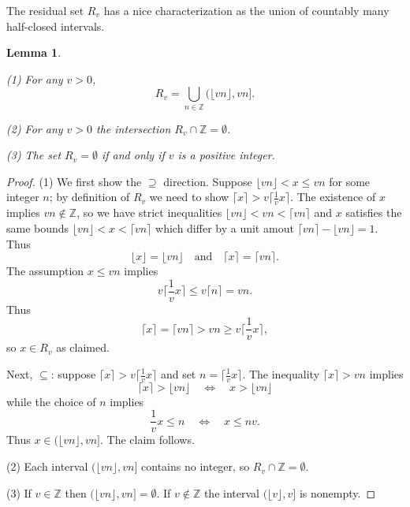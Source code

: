 \documentclass[12pt,letterpaper, reqno]{amsart}
\newtheorem{lem}[thm]{Lemma}
\theoremstyle{definition}
\theoremstyle{remark}
\newcommand{\ZZ}{\ensuremath{\mathbb{Z}}}
\newcommand{\R}{{R}}
\newcommand{\floor}[1]{\lfloor{#1}\rfloor}
\newcommand{\ceil}[1]{\lceil{#1}\rceil}
\begin{document}
The residual set $R_v$ has a nice characterization as the union of countably many half-closed intervals.
\begin{lem}\label{lem:41}

(1) For any $v>0$,
\[ \R_v = \bigcup_{n\in\ZZ} \big( \floor{vn}, vn \big] . \]

(2)  For any $v >0$ the intersection $\R_v \cap \ZZ = \emptyset$. 

(3) The set $\R_v = \emptyset$  if and only if $v$ is a positive integer.
\end{lem}
\begin{proof}
(1) We first show  the $\supseteq$ direction. Suppose $\floor{vn}<x\leq vn$ for some integer $n$; 
by definition of $R_v$ we need to show $\ceil{x}>v\ceil{\frac1v x}$. 
The existence of $x$ implies $vn\not\in\ZZ$, so we have strict inequalities $\floor{vn}<vn<\ceil{vn}$ 
and $x$ satisfies the same bounds $\floor{vn}<x<\ceil{vn}$ which differ by a unit amout $\ceil{vn}-\floor{vn}=1$. 
Thus
\[ \floor{x}=\floor{vn} \quad\text{and}\quad \ceil{x}=\ceil{vn}.\]
The assumption $x\leq vn$ implies
\[ v\ceil{\textstyle\frac{1}{v }x} \leq v\ceil{n} = vn.\]
Thus 
\[ 
\ceil{x}= \ceil{vn}> vn  \geq v\ceil{\textstyle\frac1v x},
\]
so $x\in \R_v$ as claimed. 

Next, $\subseteq$: suppose
$\ceil{x}> v\ceil{\frac1v x}$ and set $n = \ceil{\frac1v x}$. 
The inequality $\ceil{x}>vn$ implies
\[ \ceil{x}>\floor{vn} \quad\Leftrightarrow\quad x>\floor{vn}\]
while the choice of $n$ implies
\[ \frac1v x\leq n \quad\Leftrightarrow\quad x\leq nv.\]
Thus $x\in (\floor{vn},vn]$.
The claim follows.

(2) Each interval $(\floor{vn}, vn]$ contains no integer, so  $\R_v \cap \ZZ = \emptyset$.

(3) If $v \in \ZZ$ then $(\floor{vn}, vn]= \emptyset$.
If $v \notin \ZZ$ the interval $(\floor{v},v]$ is nonempty.
\end{proof}
\end{document}
